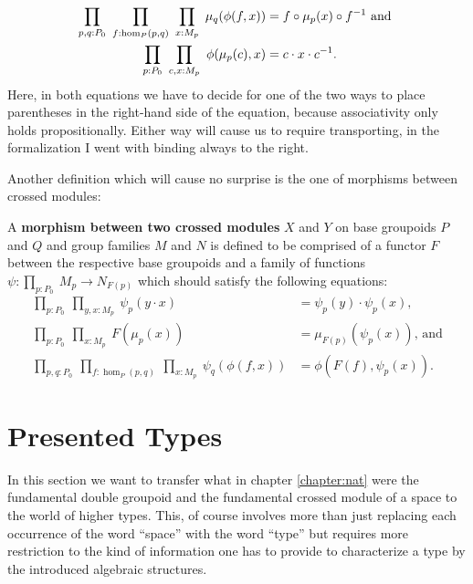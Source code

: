 \begin{defn}
\begin{itemize}
\begin{align*}
\prod_{p,q:P_0} ~ \prod_{f:\hom_P(p,q)} ~ \prod_{x:M_p} ~
	\mu_q(\phi(f,x)) &= f \circ \mu_p(x) \circ f^{-1} \text{ and } \\
\prod_{p:P_0} ~ \prod_{c,x:M_p} ~ \phi(\mu_p(c),x) &= c \cdot x \cdot c^{-1} \text{.}
\end{align*}
Here, in both equations we have to decide for one of the two ways to place parentheses
in the right-hand side of the equation, because associativity only holds propositionally.
Either way will cause us to require transporting, in the formalization I went with
binding always to the right.
\end{itemize}
\end{defn}

Another definition which will cause no surprise is the one of morphisms between
crossed modules:

\begin{defn}
A \textbf{morphism between two crossed modules} $X$ and $Y$ on base groupoids
$P$ and $Q$ and group families $M$ and $N$ is defined to be comprised
of a functor $F$ between the respective base groupoids and a family of functions
$\psi : \prod_{p:P_0} ~ M_p \to N_{F(p)}$ which should satisfy the following equations:
\begin{align*}
\prod_{p:P_0} ~ \prod_{y,x:M_p} ~ \psi_p(y \cdot x) &= \psi_p(y) \cdot \psi_p(x) \text{,} \\
\prod_{p:P_0} ~ \prod_{x:M_p} ~ F(\mu_p(x)) &= \mu_{F(p)}(\psi_p(x)) \text{, and} \\
\prod_{p,q:P_0} ~ \prod_{f:\hom_P(p,q)} ~ \prod_{x:M_p} ~
	\psi_q(\phi(f,x)) &= \phi(F(f),\psi_p(x)) \text{.}
\end{align*}
\end{defn}


\section{Presented Types}

In this section we want to transfer what in chapter \ref{chapter:nat} were the
fundamental double groupoid and the fundamental crossed module of a space to the
world of higher types.
This, of course involves more than just replacing each occurrence of the word
``space'' with the word ``type'' but requires more restriction to the kind of
information one has to provide to characterize a type by the introduced algebraic
structures.


